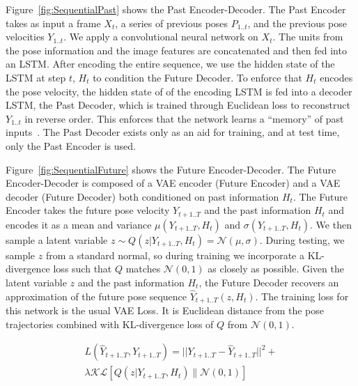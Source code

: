  Figure~\ref{fig:SequentialPast} shows the Past Encoder-Decoder. The Past Encoder takes as input a frame $X_t$, a series of previous poses $P_{1..t}$, and the previous pose velocities $Y_{1..t}$. We apply a convolutional neural network on $X_t$. The units from the pose information and the image features are concatenated and then fed into an LSTM. After encoding the entire sequence, we use the hidden state of the LSTM at step $t$, $H_t$ to condition the Future Decoder. To enforce that $H_t$ encodes the pose velocity, the hidden state of of the encoding LSTM is fed into a decoder LSTM, the Past Decoder, which is trained through Euclidean loss to reconstruct $Y_{1..t}$ in reverse order. This enforces that the network learns a ``memory'' of past inputs~\cite{Srivastava15}. The Past Decoder exists only as an aid for training, and at test time, only the Past Encoder is used.

 Figure~\ref{fig:SequentialFuture} shows the Future Encoder-Decoder. The Future Encoder-Decoder is composed of a VAE encoder (Future Encoder) and a VAE decoder (Future Decoder) both conditioned on past information $H_{t}$. The Future Encoder takes the future pose velocity $Y_{t+1..T}$ and the past information $H_t$ and encodes it as a mean and variance $\mu(Y_{t+1..T}, H_t)$ and $\sigma(Y_{t+1..T}, H_t)$. We then sample a latent variable $z \sim Q(z|Y_{t+1..T}, H_t) = \mathcal{N}(\mu,\sigma)$. During testing, we 
sample $z$ from a standard normal, so during training we incorporate a KL-divergence loss such that $Q$ matches $\mathcal{N}(0,1)$ as closely as possible. Given the latent variable $z$ and the past information $H_t$, the Future Decoder recovers an approximation of the future pose sequence $\hat{Y}_{t+1..T}(z, H_t)$. The training loss for this network is the usual VAE Loss. It is Euclidean distance from the pose trajectories combined with KL-divergence loss of $Q$ from $\mathcal{N}(0,1)$.

\vspace{-.3cm}
\begin{equation}
\begin{split}
L(\hat{Y}_{t+1..T},Y_{t+1..T}) = ||Y_{t+1..T} - \hat{Y}_{t+1..T}||^{2} +
\\
\lambda\mathcal{KL}\left[Q(z|Y_{t+1..T},H_t)\|\mathcal{N}(0,1)\right]
\label{eq:VAE}
\end{split}
\end{equation}
\vspace{-.3cm}

